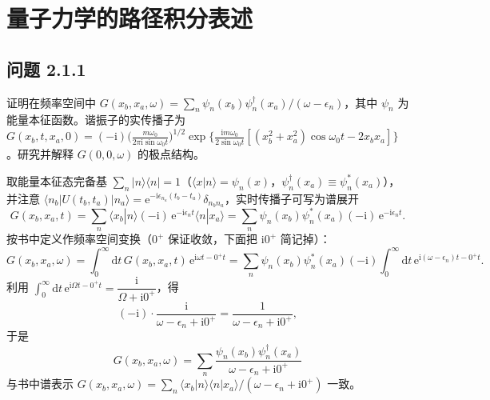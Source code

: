 \chapter{量子力学的路径积分表述}

\section*{问题 2.1.1}
\begin{problem}
证明在频率空间中 $G(x_b,x_a,\omega)=\sum_n \psi_n(x_b)\psi_n^{\dagger}(x_a)/(\omega-\epsilon_n)$，其中 $\psi_n$ 为能量本征函数。谐振子的实传播子为 $G(x_b,t,x_a,0)=(-\mathrm{i})\big(\frac{m\omega_0}{2\pi\mathrm{i}\sin\omega_0 t}\big)^{1/2}\exp\big\{\frac{\mathrm{i}m\omega_0}{2\sin\omega_0 t}[(x_b^2+x_a^2)\cos\omega_0 t-2x_bx_a]\big\}$。研究并解释 $G(0,0,\omega)$ 的极点结构。
\end{problem}
\solution
取能量本征态完备基 $\sum_n|n\rangle\langle n|=1$（$\langle x|n\rangle=\psi_n(x)$，$\psi_n^{\dagger}(x_a)\equiv\psi_n^*(x_a)$），并注意 $\langle n_b|U(t_b,t_a)|n_a\rangle=\mathrm{e}^{-\mathrm{i}\epsilon_{n_a}(t_b-t_a)}\delta_{n_bn_a}$，实时传播子可写为谱展开
\begin{equation*}
G(x_b,x_a,t)=\sum_n\langle x_b|n\rangle(-\mathrm{i})\,\mathrm{e}^{-\mathrm{i}\epsilon_n t}\langle n|x_a\rangle
=\sum_n \psi_n(x_b)\psi_n^*(x_a)(-\mathrm{i})\,\mathrm{e}^{-\mathrm{i}\epsilon_n t}.
\end{equation*}
按书中定义作频率空间变换（$0^+$ 保证收敛，下面把 $\mathrm{i}0^+$ 简记掉）：
\begin{equation*}
G(x_b,x_a,\omega)=\int_0^{\infty}\mathrm{d}t\,G(x_b,x_a,t)\,\mathrm{e}^{\mathrm{i}\omega t-0^+t}
=\sum_n \psi_n(x_b)\psi_n^*(x_a)(-\mathrm{i})\int_0^\infty\mathrm{d}t\,\mathrm{e}^{\mathrm{i}(\omega-\epsilon_n)t-0^+t}.
\end{equation*}
利用 $\int_0^\infty\mathrm{d}t\,\mathrm{e}^{\mathrm{i}\varOmega t-0^+t}=\dfrac{\mathrm{i}}{\varOmega+\mathrm{i}0^+}$，得
\begin{equation*}
(-\mathrm{i})\cdot\frac{\mathrm{i}}{\omega-\epsilon_n+\mathrm{i}0^+}=\frac{1}{\omega-\epsilon_n+\mathrm{i}0^+},
\end{equation*}
于是
\begin{equation*}
\boxed{\;G(x_b,x_a,\omega)=\sum_n\frac{\psi_n(x_b)\psi_n^{\dagger}(x_a)}{\omega-\epsilon_n+\mathrm{i}0^+}\;}
\end{equation*}
与书中谱表示 $G(x_b,x_a,\omega)=\sum_n\langle x_b|n\rangle\langle n|x_a\rangle/(\omega-\epsilon_n+\mathrm{i}0^+)$ 一致。

